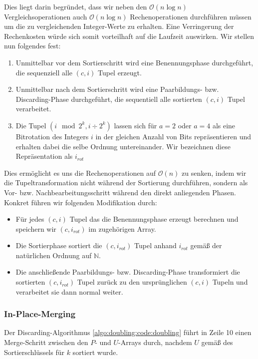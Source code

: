 Dies liegt darin begründet, dass wir neben den $\mathcal{O}(n \log n)$ Vergleichsoperationen auch $\mathcal{O}(n \log n)$ Rechenoperationen durchführen müssen um die zu vergleichenden Integer-Werte zu erhalten. Eine Verringerung der Rechenkosten würde sich somit vorteilhaft auf die Laufzeit auswirken. Wir stellen nun folgendes fest:

\begin{enumerate}
\item Unmittelbar vor dem Sortierschritt wird eine Benennungsphase durchgeführt, die sequenziell alle $(c, i)$ Tupel erzeugt.
\item Unmittelbar nach dem Sortierschritt wird eine Paarbildungs- bzw. Discarding-Phase durchgeführt, die sequentiell alle sortierten $(c, i)$ Tupel verarbeitet.
\item Die Tupel $(i \mod 2^k, i \div 2^k)$ lassen sich für $a = 2$ oder $a = 4$ als eine Bitrotation des Integers $i$ in der gleichen Anzahl von Bits repräsentieren und erhalten dabei die selbe Ordnung untereinander. Wir bezeichnen diese Repräsentation als $i_{rot}$
\end{enumerate}

Dies ermöglicht es uns die Rechenoperationen auf $\mathcal{O}(n)$ zu senken, indem wir die Tupeltransformation nicht während der Sortierung durchführen, sondern als Vor- bzw. Nachbearbeitungsschritt während den direkt anliegenden Phasen. Konkret führen wir folgenden Modifikation durch:

\begin{itemize}
\item Für jedes $(c, i)$ Tupel das die Benennungsphase erzeugt berechnen und speichern wir $(c, i_{rot})$ im zugehörigen Array.
\item Die Sortierphase sortiert die $(c, i_{rot})$ Tupel anhand $i_{rot}$ gemäß der natürlichen Ordnung auf $\mathbb{N}$.
\item Die anschließende Paarbildungs- bzw. Discarding-Phase transformiert die sortierten $(c, i_{rot})$ Tupel zurück zu den ursprünglichen $(c, i)$ Tupeln und verarbeitet sie dann normal weiter.
\end{itemize}

\subsubsection{In-Place-Merging}

Der Discarding-Algorithmus \ref{algo:doubling:code:doubling} führt in Zeile 10 einen Merge-Schritt zwischen den $P$- und $U$-Arrays durch, nachdem $U$ gemäß des Sortierschlüssels für $k$ sortiert wurde. 

